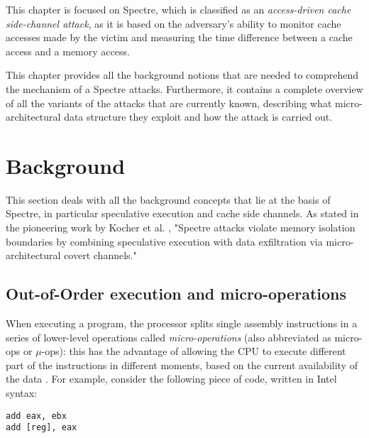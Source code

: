 \documentclass[12pt,a4paper]{book}
\theoremstyle{definition}
\begin{document}
	This chapter is focused on Spectre, which is classified as an \textit{access-driven cache side-channel attack}, as it is based on the adversary's ability to monitor cache accesses made by the victim and measuring the time difference between a cache access and a memory access.
	
	This chapter provides all the background notions that are needed to comprehend the mechanism of a Spectre attacks. Furthermore, it contains a complete overview of all the variants of the attacks that are currently known, describing what micro-architectural data structure they exploit and how the attack is carried out.
	\section{Background}
	This section deals with all the background concepts that lie at the basis of Spectre, in particular speculative execution and cache side channels. As stated in the pioneering work by Kocher et al. \cite{Kocher2019}, "Spectre attacks violate memory isolation boundaries by combining speculative execution with data exfiltration via micro-architectural covert channels."
	\subsection{Out-of-Order execution and micro-operations}\label{ooo-exec}
	When executing a program, the processor splits single assembly instructions in a series of lower-level operations called \textit{micro-operations} (also abbreviated as micro-ops or $\mu$-ops): this has the advantage of allowing the CPU to execute different part of the instructions in different moments, based on the current availability of the data \cite{Fog2021}. For example, consider the following piece of code, written in Intel syntax:
	
	\vspace{3mm}
	\begin{minipage}{.3\textwidth}
		\begin{lstlisting}
add eax, ebx
add [reg], eax
		\end{lstlisting}
	\end{minipage}
	
\end{document}
